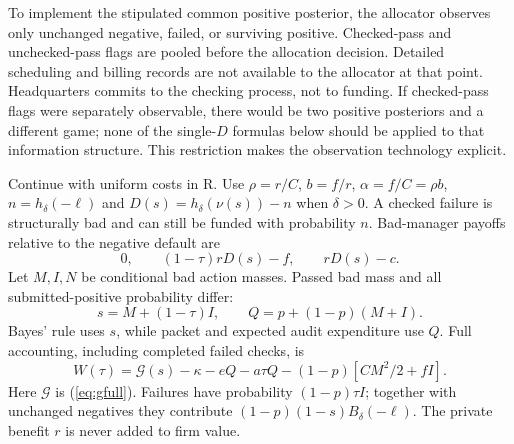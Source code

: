 \documentclass[11pt]{article}
\begin{document}
To implement the stipulated common positive posterior, the allocator observes only unchanged negative, failed, or surviving positive. Checked-pass and unchecked-pass flags are pooled before the allocation decision. Detailed scheduling and billing records are not available to the allocator at that point. Headquarters commits to the checking process, not to funding. If checked-pass flags were separately observable, there would be two positive posteriors and a different game; none of the single-$D$ formulas below should be applied to that information structure. This restriction makes the observation technology explicit.

Continue with uniform costs in R. Use $\rho=r/C$, $b=f/r$, $\alpha=f/C=\rho b$, $n=h_\delta(-\ell)$ and $D(s)=h_\delta(\nu(s))-n$ when $\delta>0$. A checked failure is structurally bad and can still be funded with probability $n$. Bad-manager payoffs relative to the negative default are
\begin{equation}
0,\qquad (1-\tau)rD(s)-f,\qquad rD(s)-c.\label{eq:randompay}
\end{equation}
Let $M,I,N$ be conditional bad action masses. Passed bad mass and all submitted-positive probability differ:
\begin{equation}s=M+(1-\tau)I,\qquad Q=p+(1-p)(M+I).\label{eq:randommass}\end{equation}
Bayes' rule uses $s$, while packet and expected audit expenditure use $Q$. Full accounting, including completed failed checks, is
\begin{equation}
W(\tau)=\mathcal G(s)-\kappa-eQ-a\tau Q-(1-p)[CM^2/2+fI].\label{eq:randomvalue}
\end{equation}
Here $\mathcal G$ is (\ref{eq:gfull}). Failures have probability $(1-p)\tau I$; together with unchanged negatives they contribute $(1-p)(1-s)B_\delta(-\ell)$. The private benefit $r$ is never added to firm value.
\end{document}
